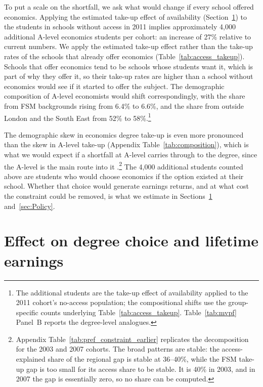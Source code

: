 
To put a scale on the shortfall, we ask what would change if every school offered economics. Applying the estimated take-up effect of availability (Section~\ref{sec:Impact}) to the students in schools without access in 2011 implies approximately 4,000 additional A-level economics students per cohort: an increase of 27\% relative to current numbers. We apply the estimated take-up effect rather than the take-up rates of the schools that already offer economics (Table~\ref{tab:access_takeup}). Schools that offer economics tend to be schools whose students want it, which is part of why they offer it, so their take-up rates are higher than a school without economics would see if it started to offer the subject. The demographic composition of A-level economists would shift correspondingly, with the share from FSM backgrounds rising from 6.4\% to 6.6\%, and the share from outside London and the South East
from 52\% to 58\%.\footnote{The additional students are the take-up effect of availability applied to the 2011 cohort's no-access population; the compositional shifts use the group-specific counts underlying Table~\ref{tab:access_takeup}. Table~\ref{tab:mvpf} Panel~B reports the degree-level analogues.}

The demographic skew in economics degree take-up is even more pronounced than the skew in A-level take-up (Appendix Table~\ref{tab:composition}), which is what we would expect if a shortfall at A-level carries through to the degree, since the A-level is the main route into it \citep{bayer2016diversity, buckles2019pipeline, lundberg2019stalled}.\footnote{Appendix Table~\ref{tab:pref_constraint_earlier} replicates the decomposition for the 2003 and 2007 cohorts. The broad patterns are stable: the access-explained share of the regional gap is stable at 36--40\%, while the FSM take-up gap is too small for its access share to be stable. It is 40\% in 2003, and in 2007 the gap is essentially zero, so no share can be computed.} The 4,000 additional students counted above are students who would choose economics if the option existed at their school. Whether that choice would generate earnings returns, and at what cost the constraint could be removed, is what we estimate in Sections~\ref{sec:Impact} and~\ref{sec:Policy}.


\section{Effect on degree choice and lifetime earnings}
\label{sec:Impact}

